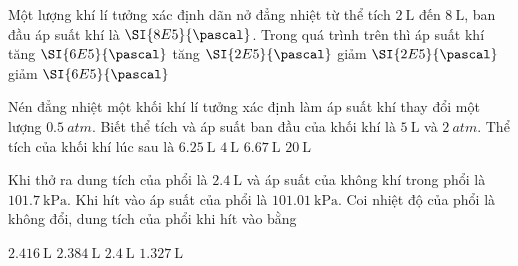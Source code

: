 \begin{ex}
	Một lượng khí lí tưởng xác định dãn nở đẳng nhiệt từ thể tích $\SI{2}{\liter}$ đến $\SI{8}{\liter}$, ban đầu áp suất khí là $\SI{8E5}{\pascal}$. Trong quá trình trên thì áp suất khí
	\choice
	{tăng $\SI{6E5}{\pascal}$}
	{tăng $\SI{2E5}{\pascal}$}
	{giảm $\SI{2E5}{\pascal}$}
	{\True giảm $\SI{6E5}{\pascal}$}
\end{ex}
\begin{ex}
	Nén đẳng nhiệt một khối khí lí tưởng xác định làm áp suất khí thay đổi một lượng $\SI{0.5}{atm}$. Biết thể tích và áp suất ban đầu của khối khí là $\SI{5}{\liter}$ và $\SI{2}{atm}$. Thể tích của khối khí lúc sau là
	\choice
	{$\SI{6.25}{\liter}$}
	{\True $\SI{4}{\liter}$}
	{$\SI{6.67}{\liter}$}
	{$\SI{20}{\liter}$}
\end{ex}
\begin{ex}
	Khi thở ra dung tích của phổi là $\SI{2.4}{\liter}$ và áp suất của không khí trong phổi là $\SI{101.7}{\kilo\pascal}$. Khi hít vào áp suất của phổi là $\SI{101.01}{\kilo\pascal}$. Coi nhiệt độ của phổi là không đổi, dung tích của phổi khi hít vào bằng
	
	\choice
	{\True $\SI{2.416}{\liter}$}
	{$\SI{2.384}{\liter}$}
	{$\SI{2.4}{\liter}$}
	{$\SI{1.327}{\liter}$}
\end{ex}
